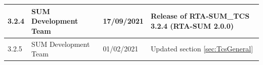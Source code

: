 \begin{longtable}{|l|l|l|l|}
\begin{minipage}{0.14\linewidth}\raggedright\vspace{.75ex}3.2.4\vspace{.75ex}\end{minipage} & \begin{minipage}{0.19\linewidth}\raggedright\vspace{.75ex}SUM Development Team\vspace{.75ex}\end{minipage} & \begin{minipage}{0.12\linewidth}\raggedright\vspace{.75ex}17/09/2021\vspace{.75ex}\end{minipage} & \begin{minipage}{0.43\linewidth}\raggedright\vspace{.75ex}Release of RTA-SUM_TCS 3.2.4 (RTA-SUM 2.0.0)\vspace{.75ex}\end{minipage}\\\hline
\begin{minipage}{0.14\linewidth}\raggedright\vspace{.75ex}3.2.5\vspace{.75ex}\end{minipage} & \begin{minipage}{0.19\linewidth}\raggedright\vspace{.75ex}SUM Development Team\vspace{.75ex}\end{minipage} & \begin{minipage}{0.12\linewidth}\raggedright\vspace{.75ex}01/02/2021\vspace{.75ex}\end{minipage} & \begin{minipage}{0.43\linewidth}\raggedright\vspace{.75ex}Updated section \ref{sec:TcsGeneral}\vspace{.75ex}\end{minipage}\\\hline

\end{longtable}
